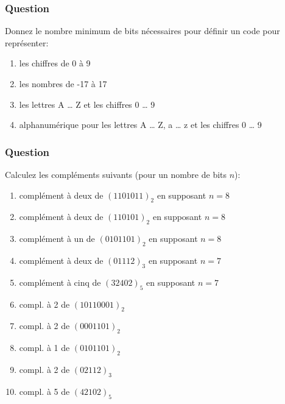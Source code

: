 \documentclass[11pt]{article}
\begin{document}
\subsubsection*{Question}
\label{sec:org0006be1}
Donnez le nombre minimum de bits nécessaires pour définir un code
   pour représenter:

\begin{enumerate}
\item les chiffres de 0 à 9

\item les nombres de -17 à 17

\item les lettres A \dots{} Z et les chiffres 0 \dots{} 9

\item alphanumérique pour les lettres A \dots{} Z, a \dots{} z et les
chiffres 0 \dots{} 9
\end{enumerate}

\subsubsection*{Question}
\label{sec:org45ebdb7}
Calculez les compléments suivants (pour un nombre de bits \(n\)):

\begin{enumerate}
\item complément à deux de \((1101011)_2\) en supposant \(n=8\)

\item complément à deux de \((110101)_2\) en supposant \(n=8\)

\item complément à un de \((0101101)_2\) en supposant \(n=8\)

\item complément à deux de \((01112)_3\) en supposant \(n=7\)

\item complément à cinq de \((32402)_5\) en supposant \(n=7\)

\item compl. à 2 de \((10110001)_2\)

\item compl. à 2 de \((0001101)_2\)

\item compl. à 1 de \((0101101)_2\)

\item compl. à 2 de \((02112)_3\)

\item compl. à 5 de \((42102)_5\)
\end{enumerate}
\end{document}
